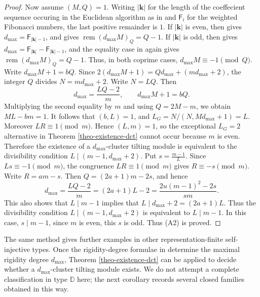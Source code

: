 \documentclass[12pt]{article}
\theoremstyle{plain}
\theoremstyle{definition}
\begin{document}
\begin{proof}
Now assume \((M,Q)=1\).  Writing \(|\mathbf{k}|\) for the length of the coeffecient sequence occuring in the  Euclidean
algorithm as in \cite{HuYinRigidityDegrees} and \(\mathsf F_i\) for the weighted Fibonacci numbers, the last positive remainder is
\(1\).  If \(|\mathbf{k}|\) is even, then
\cite[Theorem 4.1]{HuYinRigidityDegrees} gives
\(d_{\max}=\mathsf F_{|\mathbf{k}|-1}\), and
\cite[Proposition 3.4]{HuYinRigidityDegrees} gives
\(\operatorname{rem}(d_{\max}M)_Q=Q-1\).  If \(|\mathbf{k}|\) is odd, then
\cite[Theorem 4.1]{HuYinRigidityDegrees} gives
\(d_{\max}=\mathsf F_{|\mathbf{k}|}-\mathsf F_{|\mathbf{k}|-1}\), and the equality case in
\cite[Proposition 3.4]{HuYinRigidityDegrees} again gives
\(\operatorname{rem}(d_{\max}M)_Q=Q-1\).  Thus, in both coprime cases,
\(
d_{\max}M\equiv -1\pmod {Q}\). 
Write
\(
d_{\max}M+1=bQ\). 
Since \(2(d_{\max}M+1)=Qd_{\max}+(md_{\max}+2)\), the integer \(Q\) divides
\(N=md_{\max}+2\).  Write \(N=LQ\).  Then
\[
d_{\max}=\frac{LQ-2}{m},\qquad d_{\max}M+1=bQ.
\]
Multiplying the second equality by \(m\) and using \(Q=2M-m\), we obtain
\(
ML-bm=1\). 
It follows that \((b,L)=1\), and
\(L_G=N/(N,Md_{\max}+1)=L\).  Moreover \(LR\equiv1\pmod m\).  Hence \((L,m)=1\), so the
exceptional \(L_G=2\) alternative in Theorem \ref{theo-existence-dct} cannot
occur because \(m\) is even.  Therefore the existence of a \(d_{\max}\)-cluster tilting module is equivalent to the divisibility condition \(L\mid (m-1,d_{\max}+2)\).   Put
\(s=\frac{m-1}{L}\). 
Since \(Ls\equiv-1\pmod m\), the congruence \(LR\equiv1\pmod m\) gives
\(R\equiv -s\pmod m\).  Write \(R=am-s\).  Then
\(
Q=(2a+1)m-2s\), 
and hence
\[
d_{\max}=\frac{LQ-2}{m}=(2a+1)L-2=\frac{2u(m-1)^2-2s}{sm}.
\]
This also shows that $L\mid m-1$ implies that $L\mid d_{\max}+2=(2a+1)L$. Thus the divisibility condition \(L\mid (m-1,d_{\max}+2)\) is equivalent to \(L\mid m-1\). In this case, \(s\mid m-1\),  since \(m\) is even, this
\(s\) is odd.  Thus (A2) is proved.  
\end{proof}

The same method gives further examples in other representation-finite
self-injective types.  Once the rigidity-degree formulae in \cite{HuYinRigidityDegrees} determine
the maximal rigidity degree \(d_{\max}\), Theorem
\ref{theo-existence-dct} can be applied to decide whether a
\(d_{\max}\)-cluster tilting module exists.  We do not attempt a complete
classification in type \(\mathbb D\) here; the next corollary records several
closed families obtained in this way.
\end{document}
